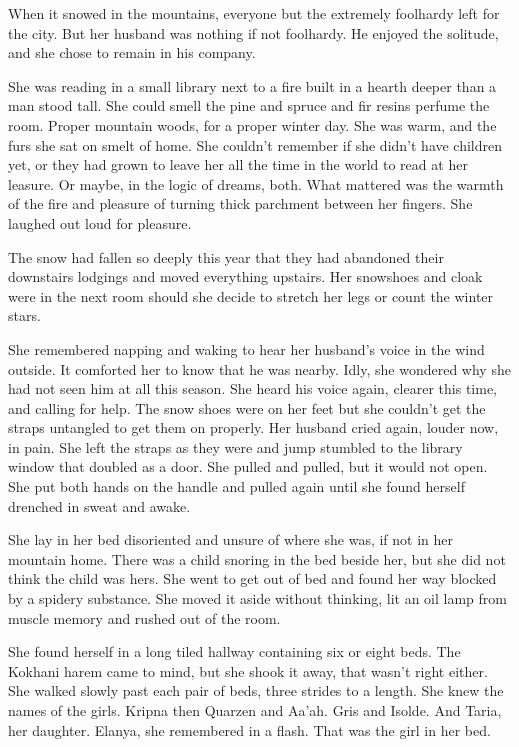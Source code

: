 \documentclass{article}
\begin{document}
	When it snowed in the mountains, everyone but the extremely foolhardy left for the city. But her husband was nothing if not foolhardy. He enjoyed the solitude, and she chose to remain in his company. 
	
	She was reading in a small library next to  a fire built in a hearth deeper than a man stood tall. She could smell the pine and spruce and fir resins perfume the room. Proper mountain woods, for a proper winter day. She was warm, and the furs she sat on smelt of home. She couldn’t remember if she didn’t have children yet, or they had grown to leave her all the time in the world to read at her leasure. Or maybe, in the logic of dreams, both. What mattered was the warmth of the fire and pleasure of turning thick parchment between her fingers. She laughed out loud for pleasure.
	
	The snow had fallen so deeply this year that they had abandoned their downstairs lodgings and moved everything upstairs. Her snowshoes and cloak were in the next room should she decide to stretch her legs or count the winter stars. 
	
	She remembered napping and waking to hear her husband’s voice in the wind outside. It comforted her to know that he was nearby. Idly, she wondered why she had not seen him at all this season. She heard his voice again, clearer this time, and calling for help. The snow shoes were on her feet but she couldn’t get the straps untangled to get them on properly. Her husband cried again, louder now, in pain. She left the straps as they were and jump stumbled to the library window that doubled as a door. She pulled and pulled, but it would not open. She put both hands on the handle and pulled again until she found herself drenched in sweat and awake. 
	
	She lay in her bed disoriented and unsure of where she was, if not in her mountain home. There was a child snoring in the bed beside her, but she did not think the child was hers. She went to get out of bed and found her way blocked by a spidery substance. She moved it aside without thinking, lit an oil lamp from muscle memory and rushed out of the room. 
	
	She found herself in a long tiled hallway containing six or eight beds. The Kokhani harem came to mind, but she shook it away, that wasn’t right either. She walked slowly past each pair of beds, three strides to a length. She knew the names of the girls. Kripna then Quarzen and Aa’ah. Gris and Isolde. And Taria, her daughter. Elanya, she remembered in a flash. That was the girl in her bed. 
	
\end{document}
